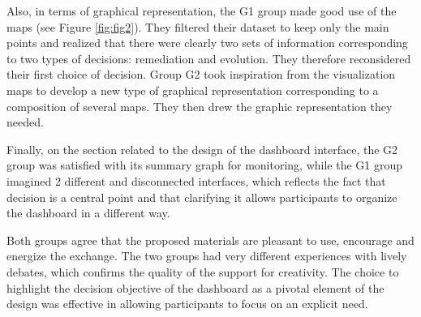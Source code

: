 \documentclass[preprint,12pt]{elsarticle}
\begin{document}
    Also, in terms of graphical representation, the G1 group made good use of the maps (see Figure \ref{fig:fig2}). They filtered their dataset to keep only the main points and realized that there were clearly two sets of information corresponding to two types of decisions: remediation and evolution. They therefore reconsidered their first choice of decision. Group G2 took inspiration from the visualization maps to develop a new type of graphical representation corresponding to a composition of several maps. They then drew the graphic representation they needed.

Finally, on the section related to the design of the dashboard interface, the G2 group was satisfied with its summary graph for monitoring, while the G1 group imagined 2 different and disconnected interfaces, which reflects the fact that decision is a central point and that clarifying it allows participants to organize the dashboard in a different way. 

Both groups agree that the proposed materials are pleasant to use, encourage and energize the exchange. The two groups had very different experiences with lively debates, which confirms the quality of the support for creativity. The choice to highlight the decision objective of the dashboard as a pivotal element of the design was effective in allowing participants to focus on an explicit need.
\end{document}
